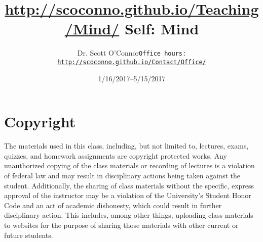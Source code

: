 \documentclass[article,oneside]{memoir}
\def\myauthor{Author}
\def\mytitle{Title}
\def\mycopyright{\myauthor}
\def\myweb{\href{http://scoconno.github.io/Teaching/Mind/}{http://scoconno.github.io/Teaching/Mind/}}
\def\myauthor{Dr. Scott O'Connor}
\def\mytitle{{\normalsize \myweb \newline} \HUGE Self: Mind}
\begin{document}
\setsansfont[Mapping=tex-text]{Myriad Pro} 
\setmonofont[Mapping=tex-text,Scale=0.8]{Georgia} 

\def\ind{\hangindent=1 true cm\hangafter=1 \noindent}
\def\labelitemi{$\cdot$}


\title{\LARGE \mytitle}     
\author{\Large\myauthor \newline \footnotesize\texttt{\noindent Office hours: \href{http://scoconno.github.io/Contact/Office/}{http://scoconno.github.io/Contact/Office/}}}
\date{1/16/2017--5/15/2017}


\maketitle




%
%

\section{Copyright}
The materials used in this class, including, but not limited to, lectures, exams, quizzes, and homework assignments are copyright protected works.  Any unauthorized copying of the class materials or recording of lectures is a violation of federal law and may result in disciplinary actions being taken against the student.  Additionally, the sharing of class materials without the specific, express approval of the instructor may be a violation of the University's Student Honor Code and an act of academic dishonesty, which could result in further disciplinary action.  This includes, among other things, uploading class materials to websites for the purpose of sharing those materials with other current or future students. 
\end{document}
